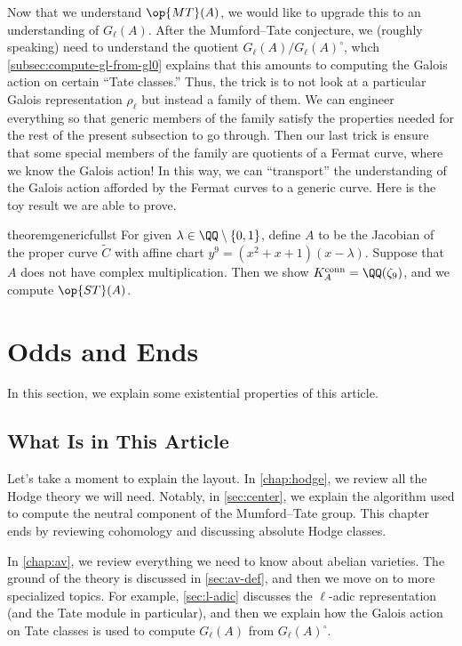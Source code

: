 \documentclass[openany]{book}
\begin{document}
Now that we understand $\op{MT}(A)$, we would like to upgrade this to an understanding of $G_\ell(A)$. After the Mumford--Tate conjecture, we (roughly speaking) need to understand the quotient $G_\ell(A)/G_\ell(A)^\circ$, whch \cref{subsec:compute-gl-from-gl0} explains that this amounts to computing the Galois action on certain ``Tate classes.'' Thus, the trick is to not look at a particular Galois representation $\rho_\ell$ but instead a family of them. We can engineer everything so that generic members of the family satisfy the properties needed for the rest of the present subsection to go through. Then our last trick is ensure that some special members of the family are quotients of a Fermat curve, where we know the Galois action! In this way, we can ``transport'' the understanding of the Galois action afforded by the Fermat curves to a generic curve. Here is the toy result we are able to prove.
\begin{restatable*}{theorem}{genericfullst}
	For given $\lambda\in\QQ\setminus\{0,1\}$, define $A$ to be the Jacobian of the proper curve $\widetilde C$ with affine chart $y^9=\left(x^2+x+1\right)(x-\lambda)$. Suppose that $A$ does not have complex multiplication. Then we show $K_A^{\mathrm{conn}}=\QQ(\zeta_9)$, and we compute $\op{ST}(A)$.
\end{restatable*}

\section{Odds and Ends}
In this section, we explain some existential properties of this article.

\subsection{What Is in This Article}
Let's take a moment to explain the layout. In \cref{chap:hodge}, we review all the Hodge theory we will need. Notably, in \cref{sec:center}, we explain the algorithm used to compute the neutral component of the Mumford--Tate group. This chapter ends by reviewing cohomology and discussing absolute Hodge classes.

In \cref{chap:av}, we review everything we need to know about abelian varieties. The ground of the theory is discussed in \cref{sec:av-def}, and then we move on to more specialized topics. For example, \cref{sec:l-adic} discusses the $\ell$-adic representation (and the Tate module in particular), and then we explain how the Galois action on Tate classes is used to compute $G_\ell(A)$ from $G_\ell(A)^\circ$.
\end{document}
